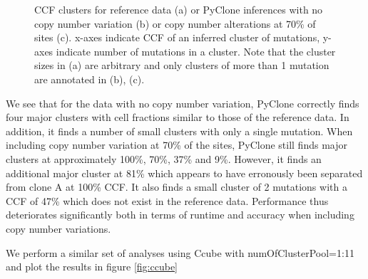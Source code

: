 \documentclass{article}
\begin{document}
\begin{figure}[h]
\begin{subfigure}[t]{0.32\linewidth}
	\end{subfigure}%
\caption{CCF clusters for reference data (a) or PyClone inferences with no copy number variation (b) or copy number alterations at 70\% of sites (c). x-axes indicate CCF of an inferred cluster of mutations, y-axes indicate number of mutations in a cluster. Note that the cluster sizes in (a) are arbitrary and only clusters of more than 1 mutation are annotated in (b), (c).}
\label{fig:pyclone}
\end{figure}

We see that for the data with no copy number variation, PyClone correctly finds four major clusters with cell fractions similar to those of the reference data. In addition, it finds a number of small clusters with only a single mutation. When including copy number variation at 70\% of the sites, PyClone still finds major clusters at approximately 100\%, 70\%, 37\% and 9\%. However, it finds an additional major cluster at 81\% which appears to have erronously been separated from clone A at 100\% CCF. It also finds a small cluster of 2 mutations with a CCF of 47\% which does not exist in the reference data. Performance thus deteriorates significantly both in terms of runtime and accuracy when including copy number variations.

We perform a similar set of analyses using Ccube with numOfClusterPool=1:11 and plot the results in figure \ref{fig:ccube}
\end{document}
